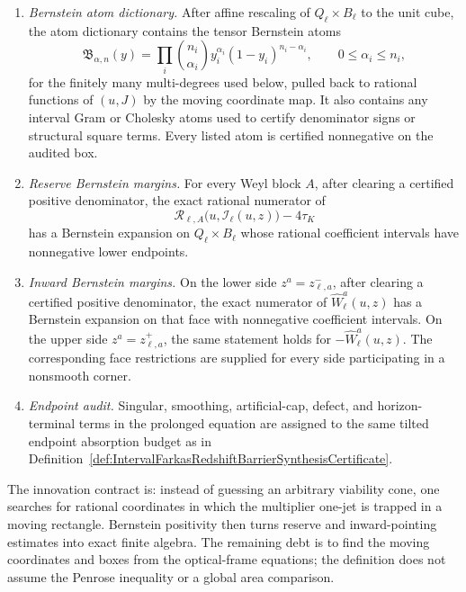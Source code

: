\begin{definition}
\begin{enumerate}
    \item \emph{Bernstein atom dictionary.}  After affine rescaling of
    $Q_\ell\times B_\ell$ to the unit cube, the atom dictionary contains the
    tensor Bernstein atoms
    \[
        \mathfrak B_{\alpha,n}(y)
        =
        \prod_i \binom{n_i}{\alpha_i}
        y_i^{\alpha_i}(1-y_i)^{n_i-\alpha_i},
        \qquad 0\le\alpha_i\le n_i,
    \]
    for the finitely many multi-degrees used below, pulled back to rational
    functions of $(u,J)$ by the moving coordinate map.  It also contains any
    interval Gram or Cholesky atoms used to certify denominator signs or
    structural square terms.  Every listed atom is certified nonnegative on
    the audited box.

    \item \emph{Reserve Bernstein margins.}  For every Weyl block $A$, after
    clearing a certified positive denominator, the exact rational numerator of
    \[
        \mathcal R_{\ell,A}\bigl(u,\mathcal I_\ell(u,z)\bigr)-4\tau_K
    \]
    has a Bernstein expansion on $Q_\ell\times B_\ell$ whose rational
    coefficient intervals have nonnegative lower endpoints.

    \item \emph{Inward Bernstein margins.}  On the lower side
    $z^a=z_{\ell,a}^-$, after clearing a certified positive denominator, the
    exact numerator of $\widehat W_\ell^a(u,z)$ has a Bernstein expansion on
    that face with nonnegative coefficient intervals.  On the upper side
    $z^a=z_{\ell,a}^+$, the same statement holds for
    $-\widehat W_\ell^a(u,z)$.  The corresponding face restrictions are
    supplied for every side participating in a nonsmooth corner.

    \item \emph{Endpoint audit.}  Singular, smoothing, artificial-cap, defect,
    and horizon-terminal terms in the prolonged equation are assigned to the
    same tilted endpoint absorption budget as in
    Definition~\ref{def:IntervalFarkasRedshiftBarrierSynthesisCertificate}.
\end{enumerate}
The innovation contract is: instead of guessing an arbitrary viability cone,
one searches for rational coordinates in which the multiplier one-jet is
trapped in a moving rectangle.  Bernstein positivity then turns reserve and
inward-pointing estimates into exact finite algebra.  The remaining debt is to
find the moving coordinates and boxes from the optical-frame equations; the
definition does not assume the Penrose inequality or a global area comparison.
\end{definition}

